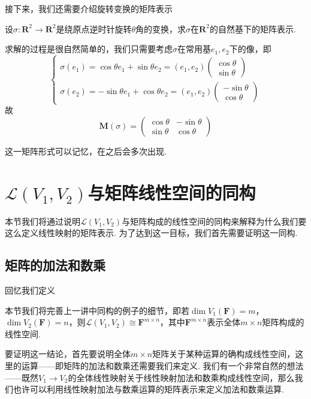 接下来，我们还需要介绍旋转变换的矩阵表示
\begin{example}{}{}
    设$\sigma\colon\mathbf{R}^2\to\mathbf{R}^2$是绕原点逆时针旋转$\theta$角的变换，求$\sigma$在$\mathbf{R}^2$的自然基下的矩阵表示.
\end{example}
\begin{solution}
    求解的过程是很自然简单的，我们只需要考虑$\sigma$在常用基$e_1,e_2$下的像，即
    \[
    \begin{cases}
        \sigma(e_1)=\cos\theta e_1+\sin\theta e_2=(e_1,e_2)\begin{pmatrix}
            \cos\theta \\ \sin\theta
        \end{pmatrix} \\
        \sigma(e_2)=-\sin\theta e_1+\cos\theta e_2=(e_1,e_2)\begin{pmatrix}
            -\sin\theta \\ \cos\theta
        \end{pmatrix}
    \end{cases}
    \]
    故
    \[\mathbf{M}(\sigma)=\begin{pmatrix}
        \cos\theta & -\sin\theta \\
        \sin\theta & \cos\theta
    \end{pmatrix}\]

\end{solution}
这一矩阵形式可以记忆，在之后会多次出现.

\section{$\mathcal{L}(V_1,V_2)$与矩阵线性空间的同构}

本节我们将通过说明$\mathcal{L}(V_1,V_2)$与矩阵构成的线性空间的同构来解释为什么我们要这么定义线性映射的矩阵表示. 为了达到这一目标，我们首先需要证明这一同构.

\subsection{矩阵的加法和数乘}

回忆我们定义

本节我们将完善上一讲中同构的例子的细节，即若$\dim V_1(\mathbf{F})=m$，$\dim V_2(\mathbf{F})=n$，则$\mathcal{L}(V_1,V_2) \cong \mathbf{F}^{m \times n}$，其中$\mathbf{F}^{m \times n}$表示全体$m\times n$矩阵构成的线性空间.

要证明这一结论，首先要说明全体$m\times n$矩阵关于某种运算的确构成线性空间，这里的运算——即矩阵的加法和数乘还需要我们来定义. 我们有一个非常自然的想法——既然$V_1\to V_2$的全体线性映射关于线性映射加法和数乘构成线性空间，那么我们也许可以利用线性映射加法与数乘运算的矩阵表示来定义加法和数乘运算.


